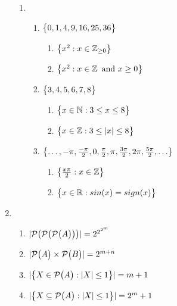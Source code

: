\begin{enumerate}
\begin{enumerate}[label=(\alph*), itemsep=16pt]
                  \item
                        \begin{enumerate}[label=(\roman*), itemsep=10pt]
                              \item $\bigl\{ {0, 1, 4, 9, 16, 25, 36} \bigr\}$ \vspace*{0.2cm}
                                    \begin{enumerate}[label=(\arabic*)]
                                          \item $\bigl\{ { x^2 : x \in \operatorname{\mathbb{Z}}_{\geq 0} } \bigr\}$
                                          \item $\bigl\{ { x^2 : x \in \operatorname{\mathbb{Z}} \text{ and } x \geq 0 } \bigr\}$
                                    \end{enumerate}
                              \item $\bigl\{ {3, 4, 5, 6, 7, 8} \bigr\}$ \vspace*{0.2cm}
                                    \begin{enumerate}[label=(\arabic*)]
                                          \item $\bigl\{ { x \in \operatorname{\mathbb{N}} : 3 \leq x \leq 8 } \bigr\}$
                                          \item $\bigl\{ { x \in \operatorname{\mathbb{Z}} : 3 \leq \lvert {x} \rvert \leq 8 } \bigr\}$
                                    \end{enumerate}
                              \item $\bigl\{ {\ldots, -\pi, \frac{-\pi}{2}, 0, \frac{\pi}{2}, \pi, \frac{3\pi}{2}, 2\pi, \frac{5\pi}{2}, \ldots} \bigr\}$ \vspace*{0.2cm}
                                    \begin{enumerate}[label=(\arabic*)]
                                          \item $\bigl\{ { \frac{x\pi}{2} : x \in \operatorname{\mathbb{Z}} } \bigr\}$
                                          \item $\bigl\{ { x \in \mathbb{R} : sin(x) = sign(x)} \bigr\}$
                                    \end{enumerate}
                        \end{enumerate}
            \end{enumerate}

      \item
            \begin{enumerate}[label=(\alph*), itemsep=10pt]
                  \item $\lvert {\mathcal{P}\bigl( {\mathcal{P}\bigl( {\mathcal{P}\bigl( {A} \bigr)} \bigr)} \bigr)} \rvert = 2^{2^{2^m}}$
                  \item $\lvert {\mathcal{P}\bigl( {A} \bigr)\times\mathcal{P}\bigl( {B} \bigr)} \rvert = 2^{m + n}$
                  \item $\lvert {\bigl\{ {X \in \mathcal{P}\bigl( {A} \bigr) : \lvert {X} \rvert \leq 1} \bigr\}} \rvert = m + 1$
                  \item $\lvert {\bigl\{ {X \subseteq \mathcal{P}\bigl( {A} \bigr) : \lvert {X} \rvert \leq 1} \bigr\}} \rvert = 2^m + 1$
            \end{enumerate}
\end{enumerate}


